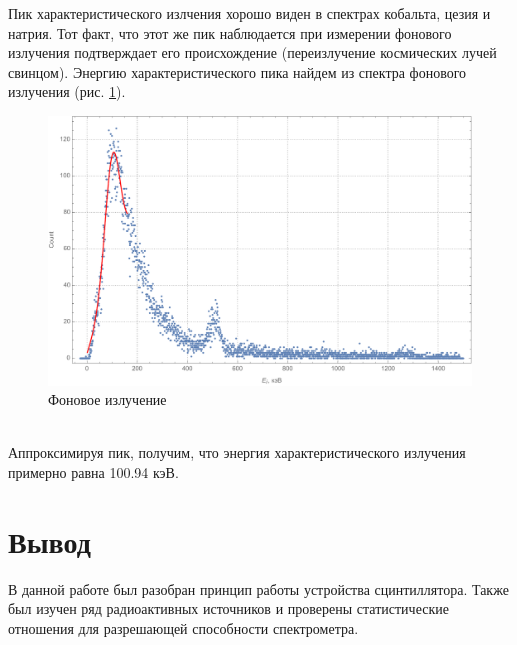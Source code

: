 \documentclass[a4paper, 12pt]{article}
\begin{document}
Пик характеристического излчения хорошо виден в спектрах кобальта, цезия и натрия. Тот факт, что этот же пик наблюдается при измерении фонового излучения подтверждает его происхождение (переизлучение космических лучей свинцом). Энергию характеристического пика найдем из спектра фонового излучения (рис. \ref{fig:background}).
\begin{figure}[!htb]
\centering
\includegraphics[scale=0.6]{backgroundPb.pdf}
\caption{Фоновое излучение}
\label{fig:background}
\end{figure}
\\
Аппроксимируя пик, получим, что энергия характеристического излучения примерно равна 100.94 кэВ.
\section{Вывод}
В данной работе был разобран принцип работы устройства сцинтиллятора. Также был изучен ряд радиоактивных источников и проверены статистические отношения для разрешающей способности спектрометра.
\end{document}
